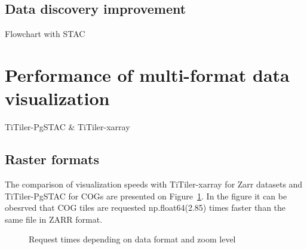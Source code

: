 \documentclass[
  oneside,
  open=any]{scrbook}
\begin{document}
\subsection{Data discovery
improvement}\label{data-discovery-improvement}

Flowchart with STAC

\section{Performance of multi-format data
visualization}\label{performance-of-multi-format-data-visualization}

TiTiler-PgSTAC \& TiTiler-xarray

\subsection{Raster formats}\label{raster-formats}

The comparison of visualization speeds with TiTiler-xarray for Zarr
datasets and TiTiler-PgSTAC for COGs are presented on
Figure~\ref{fig-format-comp}. In the figure it can be obesrved that COG
tiles are requested np.float64(2.85) times faster than the same file in
ZARR format.

\begin{figure}[H]


\caption{\label{fig-format-comp}Request times depending on data format
and zoom level}

\end{figure}%
\end{document}
